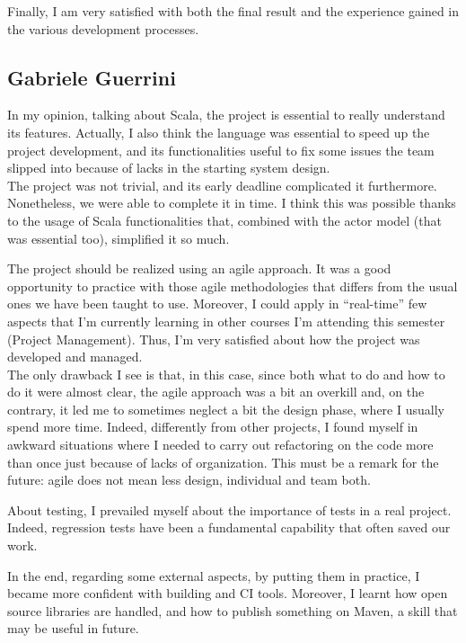 Finally, I am very satisfied with both the final result and the experience gained in the various development processes.



\subsection{Gabriele Guerrini}
In my opinion, talking about Scala, the project is essential to really understand its features. Actually, I also think the language was essential to speed up the project development, and its functionalities useful to fix some issues the team slipped into because of lacks in the starting system design.
\\
The project was not trivial, and its early deadline complicated it furthermore. Nonetheless, we were able to complete it in time. I think this was possible thanks to the usage of Scala functionalities that, combined with the actor model (that was essential too), simplified it so much.

\bigskip
The project should be realized using an agile approach. It was a good opportunity to practice with those agile methodologies that differs from the usual ones we have been taught to use.
Moreover, I could apply in ``real-time'' few aspects that I'm currently learning in other courses I'm attending this semester (Project Management).
Thus, I'm very satisfied about how the project was developed and managed.
\\
The only drawback I see is that, in this case, since both what to do and how to do it were almost clear, the agile approach was a bit an overkill and, on the contrary, it led me to sometimes neglect a bit the design phase, where I usually spend more time. Indeed, differently from other projects, I found myself in awkward situations where I needed to carry out refactoring on the code more than once just because of lacks of organization. This must be a remark for the future: agile does not mean less design, individual and team both.

\bigskip
About testing, I prevailed myself about the importance of tests in a real project. Indeed, regression tests have been a fundamental capability that often saved our work.

\bigskip
In the end, regarding some external aspects, by putting them in practice, I became more confident with building and CI tools. Moreover, I learnt how open source libraries are handled, and how to publish something on Maven, a skill that may be useful in future.










